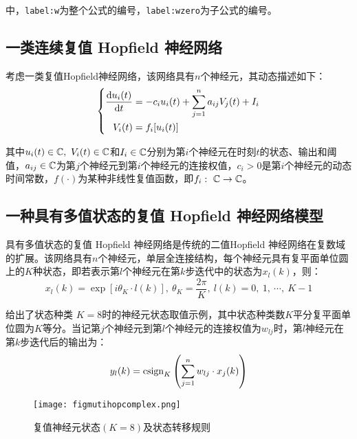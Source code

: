 \documentclass{hitszthesis}
\begin{document}
中，\lstinline{label:w}为整个公式的编号，\lstinline{label:wzero}为子公式的编号。

\subsection{一类连续复值 Hopf\/ield 神经网络}

考虑一类复值Hopf\/ield神经网络，该网络具有$n$个神经元，其动态描述如下：
\begin{equation}
\left\{
\begin{aligned}
	\frac{\text{d} u_i(t)}{\text{d} t}&=-c_iu_i(t)+\sum\limits_{j=1}^na_{ij}V_{j}(t)+I_i\\
	V_i(t)&=f_i[u_i(t)]
\end{aligned}
\right.
\end{equation}

其中$u_i(t)\in \mathbb{C},\ V_i(t)\in \mathbb{C}$和$I_i\in\mathbb{C}$分别为第$i$个神经元在时刻$t$的状态、输出和阈值，$a_{ij}\in\mathbb{C}$为第$j$个神经元到第$i$个神经元的连接权值，$c_i>0$是第$i$个神经元的动态时间常数，$f(\cdot)$为某种非线性复值函数，即$f_i:\ \mathbb{C}\rightarrow\mathbb{C}$。

\subsection{一种具有多值状态的复值 Hopf\/ield 神经网络模型}
具有多值状态的复值 Hopf\/ield 神经网络是传统的二值Hopf\/ield 神经网络在复数域的扩展。该网络具有$n$个神经元，单层全连接结构，每个神经元具有复平面单位圆上的$K$种状态，即若表示第$l$个神经元在第$k$步迭代中的状态为$x_l(k)$，则：
\begin{equation}
x_l(k)=\exp[{i\theta_K\cdot l(k)}],\ \theta_K=\frac{2\pi}{K},\ l(k)=0,\ 1,\ \cdots,\ K-1
\end{equation}
 
 给出了状态种类 $K=8$时的神经元状态取值示例，其中状态种类数$K$平分复平面单位圆为$K$等分。当记第$j$个神经元到第$l$个神经元的连接权值为$w_{lj}$时，第$l$神经元在第$k$步迭代后的输出为：
\begin{equation}
y_l(k) = \operatorname{csign}_K\left(\sum\limits_{j=1}^n w_{lj}\cdot x_j(k)\right)
\label{eqiter}
\end{equation}
\begin{figure}[!htbp]
	\centering
	\texttt{[image: figmutihopcomplex.png]}
	\caption{复值神经元状态$(K=8)$及状态转移规则}
     \label{figmulti}
\end{figure}
\end{document}
